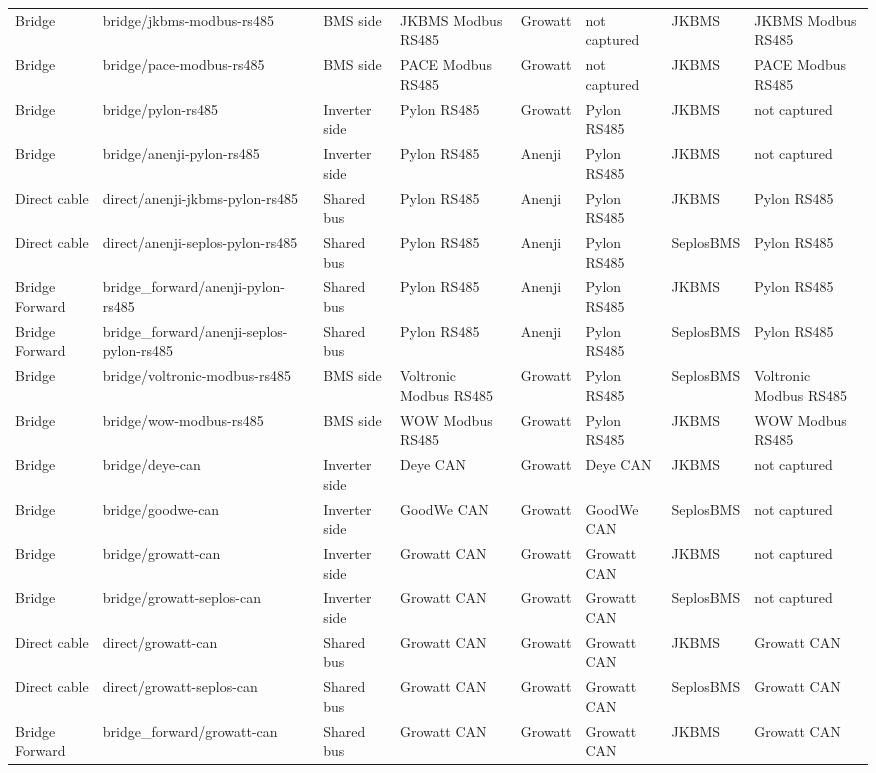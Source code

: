 \documentclass[11pt,a4paper]{article}
\begin{document}
\begin{landscape}
\begin{longtable}{@{}L{1.6cm}L{3.6cm}L{2.2cm}L{3.0cm}L{2.0cm}L{2.8cm}L{2.0cm}L{3.0cm}@{}}
Bridge & bridge/jkbms-modbus-rs485 & BMS side & JKBMS Modbus RS485 & Growatt & not captured & JKBMS & JKBMS Modbus RS485 \\
Bridge & bridge/pace-modbus-rs485 & BMS side & PACE Modbus RS485 & Growatt & not captured & JKBMS & PACE Modbus RS485 \\
Bridge & bridge/pylon-rs485 & Inverter side & Pylon RS485 & Growatt & Pylon RS485 & JKBMS & not captured \\
Bridge & bridge/anenji-pylon-rs485 & Inverter side & Pylon RS485 & Anenji & Pylon RS485 & JKBMS & not captured \\
Direct cable & direct/anenji-jkbms-pylon-rs485 & Shared bus & Pylon RS485 & Anenji & Pylon RS485 & JKBMS & Pylon RS485 \\
Direct cable & direct/anenji-seplos-pylon-rs485 & Shared bus & Pylon RS485 & Anenji & Pylon RS485 & SeplosBMS & Pylon RS485 \\
Bridge Forward & bridge\_forward/anenji-pylon-rs485 & Shared bus & Pylon RS485 & Anenji & Pylon RS485 & JKBMS & Pylon RS485 \\
Bridge Forward & bridge\_forward/anenji-seplos-pylon-rs485 & Shared bus & Pylon RS485 & Anenji & Pylon RS485 & SeplosBMS & Pylon RS485 \\
Bridge & bridge/voltronic-modbus-rs485 & BMS side & Voltronic Modbus RS485 & Growatt & Pylon RS485 & SeplosBMS & Voltronic Modbus RS485 \\
Bridge & bridge/wow-modbus-rs485 & BMS side & WOW Modbus RS485 & Growatt & Pylon RS485 & JKBMS & WOW Modbus RS485 \\
Bridge & bridge/deye-can & Inverter side & Deye CAN & Growatt & Deye CAN & JKBMS & not captured \\
Bridge & bridge/goodwe-can & Inverter side & GoodWe CAN & Growatt & GoodWe CAN & SeplosBMS & not captured \\
Bridge & bridge/growatt-can & Inverter side & Growatt CAN & Growatt & Growatt CAN & JKBMS & not captured \\
Bridge & bridge/growatt-seplos-can & Inverter side & Growatt CAN & Growatt & Growatt CAN & SeplosBMS & not captured \\
Direct cable & direct/growatt-can & Shared bus & Growatt CAN & Growatt & Growatt CAN & JKBMS & Growatt CAN \\
Direct cable & direct/growatt-seplos-can & Shared bus & Growatt CAN & Growatt & Growatt CAN & SeplosBMS & Growatt CAN \\
Bridge Forward & bridge\_forward/growatt-can & Shared bus & Growatt CAN & Growatt & Growatt CAN & JKBMS & Growatt CAN \\

\end{longtable}
\end{landscape}
\end{document}
